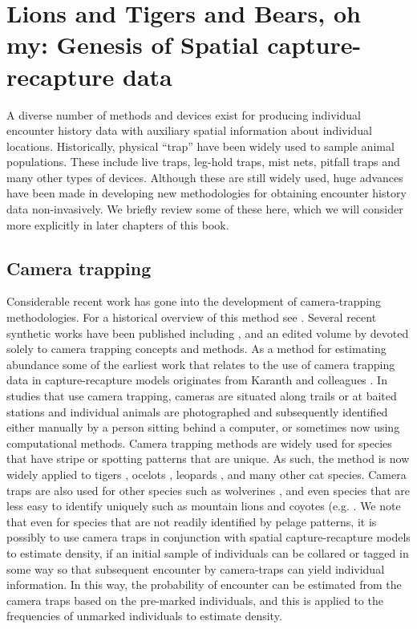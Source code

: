 \section{Lions and Tigers and Bears, oh my:  Genesis of
Spatial capture-recapture data}

A diverse number of methods and devices exist for producing individual
encounter history data with auxiliary spatial information about
individual locations. Historically, physical ``trap'' have been widely
used to sample animal populations. These include live traps, leg-hold
traps, mist nets, pitfall traps and many other types of
devices. Although these are still widely used, huge advances have been
made in developing new methodologies for obtaining encounter history
data non-invasively. We briefly review some of these here, which we
will consider more explicitly in later chapters of this book. 

\subsection{Camera trapping}

Considerable recent work has gone into the development of
camera-trapping methodologies. For a historical overview of this
method see \citet{kays_etal:2008, kucera_barrett:2011}.  Several
recent synthetic works have been published including
\citet{nichols_karanth:2002}, and an edited volume by
\citet{oconnell_etal:2010} devoted solely to camera trapping concepts
and methods. As a method for estimating abundance some of the earliest
work that relates to the use of camera trapping data in
capture-recapture models originates from Karanth and colleagues
\citep{karanth:1995, karanth_nichols:1998, karanth_nichols:2000}. In
studies that use camera trapping, cameras are situated along trails or
at baited stations and individual animals are photographed and
subsequently identified either manually by a person sitting behind a
computer,  or sometimes now using computational
methods. Camera trapping methods are widely used for species that have
stripe or spotting patterns that are unique. As such, the method is
now widely applied to tigers \citep{karanth:1995,
  karanth_nichols:1998}, ocelots
\citep{trolle_kery:2003,trolle_kery:2005}, leopards
\citep{balme_etal:2010}, and many other cat species. Camera traps are
also used for other species such as wolverines
\citep{magoun_etal:2011}, and even species that are less easy to
identify uniquely such as mountain lions and coyotes
(e.g. \citet{kelly_etal:2008}.  We note that even for species that are
not readily identified by pelage patterns, it is possibly to use
camera traps in conjunction with spatial capture-recapture models to
estimate density, if an initial sample of individuals can be collared
or tagged in some way so that subsequent encounter by camera-traps can
yield individual information. In this way, the probability of
encounter can be estimated from the camera traps based on the
pre-marked individuals, and this is applied to the frequencies of
unmarked individuals to estimate density.



